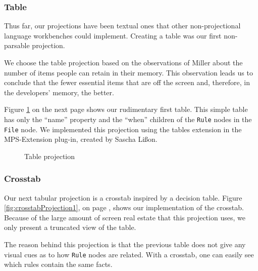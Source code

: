 \newpage

\subsubsection{Table}
Thus far, our projections have been textual ones that other non-projectional language workbenches could implement.
Creating a table was our first non-parsable projection.

We choose the table projection based on the observations of Miller\cite{miller1956magical} about the number of items people can retain in their memory.
This observation leads us to conclude that the fewer essential items that are off the screen and, therefore, in the developers' memory, the better.

Figure \ref{fig:tableProjection1} on the next page shows our rudimentary first table.
This simple table has only the ``name'' property and the ``when'' children of the \texttt{Rule} nodes in the \texttt{File} node.
We implemented this projection using the tables extension in the MPS-Extension plug-in, created by Sascha Lißon.

\begin{figure}
    \centering
    \caption{Table projection}
    \label{fig:tableProjection1}
\end{figure}

\subsubsection{Crosstab}
Our next tabular projection is a crosstab inspired by a decision table.
Figure \ref{fig:crosstabProjection1}, on page \pageref{fig:crosstabProjection1}, shows our implementation of the crosstab.
Because of the large amount of screen real estate that this projection uses, we only present a truncated view of the table.

The reason behind this projection is that the previous table does not give any visual cues as to how \texttt{Rule} nodes are related.
With a crosstab, one can easily see which rules contain the same facts.

